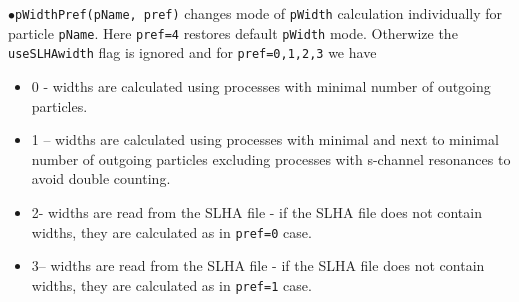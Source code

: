 \documentclass[12pt,a4paper]{article}
\begin{document}
\noindent
$\bullet$\verb|pWidthPref(pName, pref)| changes mode of {\tt pWidth} calculation individually for particle {\tt pName}. Here {\tt pref=4} restores default {\tt pWidth} mode. Otherwize the 
{\tt useSLHAwidth}  flag is ignored and for {\tt pref=0,1,2,3} we have    
%
%
\begin{itemize}
\item{} 0 -  widths are calculated using processes with minimal number of outgoing particles.
\item{}1 -- widths are calculated using processes with minimal and next to minimal number of outgoing particles excluding
                       processes with  s-channel resonances to avoid double counting.
\item{} 2- widths are read from the SLHA file - if the SLHA file does not contain widths, they are calculated as in {\tt pref=0} case.
\item{} 3-- widths are read from the SLHA file - if the SLHA file does not contain widths, they are calculated as in {\tt pref=1} case.
\end{itemize}
\end{document}
